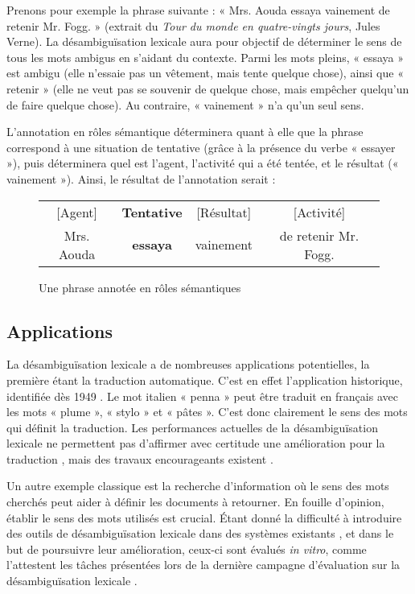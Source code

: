 Prenons pour exemple la phrase suivante : « Mrs. Aouda essaya vainement de retenir Mr. Fogg. » (extrait du \textit{Tour du monde en quatre-vingts jours}, Jules Verne). La désambiguïsation lexicale aura pour objectif de déterminer le sens de tous les mots ambigus en s'aidant du contexte. Parmi les mots pleins, « essaya » est ambigu (elle n'essaie pas un vêtement, mais tente quelque chose), ainsi que « retenir » (elle ne veut pas se souvenir de quelque chose, mais empêcher quelqu'un de faire quelque chose). Au contraire, « vainement » n'a qu'un seul sens.

L'annotation en rôles sémantique déterminera quant à elle que la phrase correspond à une situation de tentative (grâce à la présence du verbe « essayer »), puis déterminera quel est l'agent, l'activité qui a été tentée, et le résultat (« vainement »). Ainsi, le résultat de l'annotation serait :

\begin{figure}[htbl]
    \centering
    \begin{tabular}{cccc}
      [Agent]  & \textbf{Tentative} & [Résultat]  & [Activité]           \tabularnewline
    Mrs. Aouda & \textbf{essaya}  & vainement  & de retenir Mr. Fogg. \tabularnewline
    \end{tabular}
    \caption{Une phrase annotée en rôles sémantiques}
\end{figure}

\subsection{Applications}

La désambiguïsation lexicale a de nombreuses applications potentielles, la première étant la traduction automatique. C'est en effet l'application historique, identifiée dès 1949 \citep{weaver1949translation}. Le mot italien « penna » peut être traduit en français avec les mots « plume », « stylo » et « pâtes ». C'est donc clairement le sens des mots qui définit la traduction. Les performances actuelles de la désambiguïsation lexicale ne permettent pas d'affirmer avec certitude une amélioration pour la traduction \citep{apidianaki2009place}, mais des travaux encourageants existent \citep{chan2007word}.

Un autre exemple classique est la recherche d'information où le sens des mots cherchés peut aider à définir les documents à retourner. En fouille d'opinion, établir le sens des mots utilisés est crucial. Étant donné la difficulté à introduire des outils de désambiguïsation lexicale dans des systèmes existants \citep{navigli2009word}, et dans le but de poursuivre leur amélioration, ceux-ci sont évalués \textit{in vitro}, comme l'attestent les tâches présentées lors de la dernière campagne d'évaluation sur la désambiguïsation lexicale \citep{agirre2010semeval,manandhar2010semeval,lefever2010semeval}.

